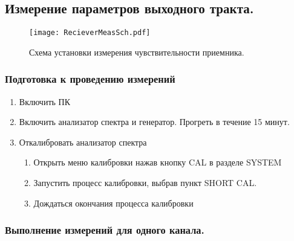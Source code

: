 \subsection{Измерение параметров выходного тракта.}

\begin{figure}[H]
	\centering
	\texttt{[image: RecieverMeasSch.pdf]}
	\caption{Схема установки измерения чувствительности приемника.}
	\label{fig:RecieverMeasSch}
\end{figure}

\subsubsection{Подготовка к проведению измерений}

\begin{enumerate}
	\setlength\itemsep{-1ex}
	\item Включить ПК 
	\item Включить анализатор спектра и генератор. Прогреть в течение 15 минут.
	\item Откалибровать анализатор спектра
	\begin{enumerate}
		\item Открыть меню калибровки нажав кнопку CAL в разделе SYSTEM
		\item Запустить процесс калибровки, выбрав пункт SHORT CAL.
		\item Дождаться окончания процесса калибровки
	\end{enumerate}
\end{enumerate}

\subsubsection{Выполнение измерений для одного канала.}

